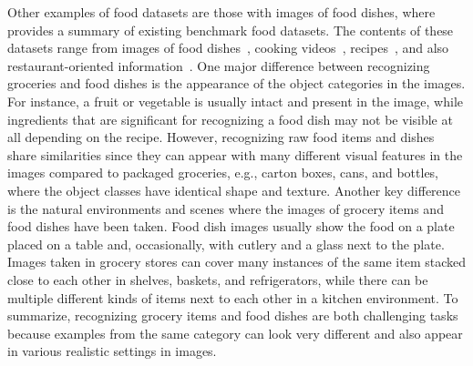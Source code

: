 Other examples of food datasets are those with images of food dishes, where  provides a summary of existing benchmark food datasets. The contents of these datasets range from images of food dishes~, cooking videos~, recipes~, and also restaurant-oriented information~. One major difference between recognizing groceries and food dishes is the appearance of the object categories in the images. For instance, a fruit or vegetable is usually intact and present in the image, while ingredients that are significant for recognizing a food dish may not be visible at all depending on the recipe. However, recognizing raw food items and dishes share similarities since they can appear with many different visual features in the images compared to packaged groceries, e.g., carton boxes, cans, and bottles, where the object classes have identical shape and texture. 
Another key difference is the natural environments and scenes where the images of grocery items and food dishes have been taken. Food dish images usually show the food on a plate placed on a table and, occasionally, with cutlery and a glass next to the plate. Images taken in grocery stores can cover many instances of the same item stacked close to each other in shelves, baskets, and refrigerators, while there can be multiple different kinds of items next to each other in a kitchen environment. 
To summarize, recognizing grocery items and food dishes are both challenging tasks because examples from the same category can look very different and also appear in various realistic settings in images.

\vspace{-3mm}
